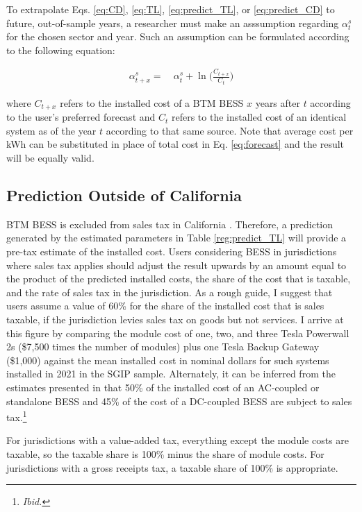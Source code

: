 \documentclass[preprint,12pt,authoryear]{elsarticle}
\begin{document}
To extrapolate Eqs. \ref{eq:CD}, \ref{eq:TL}, \ref{eq:predict_TL}, or \ref{eq:predict_CD} to future, out-of-sample years, a researcher must make an asssumption regarding $\alpha^s_t$ for the chosen sector and year. Such an assumption can be formulated according to the following equation:

\begin{align}
    \alpha^{s}_{t+x} = &~\alpha^{s}_{t} + \ln\bigg(\frac{C_{t+x}}{C_{t}}\bigg) \label{eq:forecast}
\end{align}

where $C_{t+x}$ refers to the installed cost of a BTM BESS $x$ years after $t$ according to the user's preferred forecast and $C_{t}$ refers to the installed cost of an identical system as of the year $t$ according to that same source. Note that average cost per kWh can be substituted in place of total cost in Eq. \ref{eq:forecast} and the result will be equally valid. 

\subsection{Prediction Outside of California}\label{sec:sales_tax}

BTM BESS is excluded from sales tax in California \citep{DSIRE_sales_CA}. Therefore, a prediction generated by the estimated parameters in Table \ref{reg:predict_TL} will provide a pre-tax estimate of the installed cost. Users considering BESS in jurisdictions where sales tax applies should adjust the result upwards by an amount equal to the product of the predicted installed costs, the share of the cost that is taxable, and the rate of sales tax in the jurisdiction. As a rough guide, I suggest that users assume a value of 60\% for the share of the installed cost that is sales taxable, if the jurisdiction levies sales tax on goods but not services. I arrive at this figure by comparing the module cost of one, two, and three Tesla Powerwall 2s (\$7,500 times the number of modules) plus one Tesla Backup Gateway (\$1,000) against the mean installed cost in nominal dollars for such systems installed in 2021 in the SGIP sample. Alternately, it can be inferred from the estimates presented in \citet{ramasamy2021} that 50\% of the installed cost of an AC-coupled or standalone BESS and 45\% of the cost of a DC-coupled BESS are subject to sales tax.\footnote{\textit{Ibid.}}

For jurisdictions with a value-added tax, everything except the module costs are taxable, so the taxable share is 100\% minus the share of module costs. For jurisdictions with a gross receipts tax, a taxable share of 100\% is appropriate.
\end{document}
